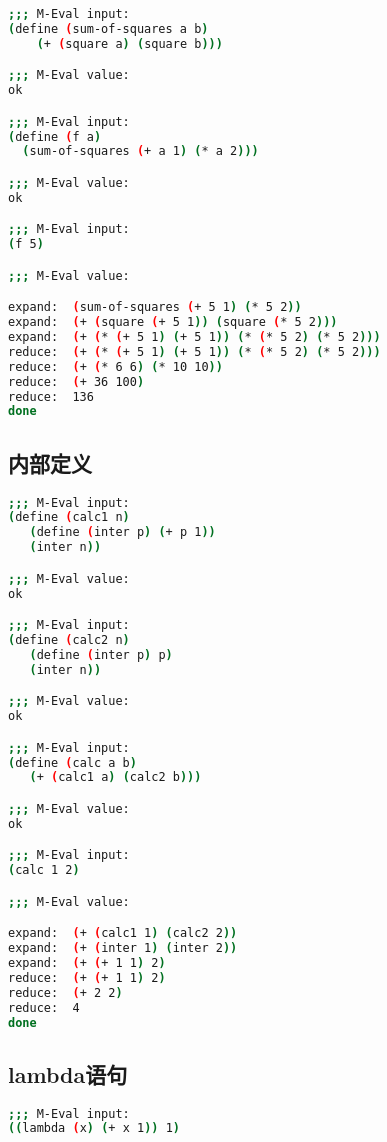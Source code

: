 \documentclass{article}
\begin{document}
\begin{CJK*}{UTF8}{gkai}
\begin{lstlisting}[language=bash, numbers=none, backgroundcolor=\color{black}, basicstyle=\scriptsize\color{green}\ttfamily\bfseries]
;;; M-Eval input:
(define (sum-of-squares a b)
    (+ (square a) (square b)))

;;; M-Eval value:
ok

;;; M-Eval input:
(define (f a)
  (sum-of-squares (+ a 1) (* a 2)))

;;; M-Eval value:
ok

;;; M-Eval input:
(f 5)

;;; M-Eval value:

expand:  (sum-of-squares (+ 5 1) (* 5 2))
expand:  (+ (square (+ 5 1)) (square (* 5 2)))
expand:  (+ (* (+ 5 1) (+ 5 1)) (* (* 5 2) (* 5 2)))
reduce:  (+ (* (+ 5 1) (+ 5 1)) (* (* 5 2) (* 5 2)))
reduce:  (+ (* 6 6) (* 10 10))
reduce:  (+ 36 100)
reduce:  136
done

\end{lstlisting}

\subsection{内部定义}

\begin{lstlisting}[language=bash, numbers=none, backgroundcolor=\color{black}, basicstyle=\scriptsize\color{green}\ttfamily\bfseries]
;;; M-Eval input:
(define (calc1 n)
   (define (inter p) (+ p 1))
   (inter n))

;;; M-Eval value:
ok

;;; M-Eval input:
(define (calc2 n)
   (define (inter p) p)
   (inter n))

;;; M-Eval value:
ok

;;; M-Eval input:
(define (calc a b)
   (+ (calc1 a) (calc2 b)))

;;; M-Eval value:
ok

;;; M-Eval input:
(calc 1 2)

;;; M-Eval value:

expand:  (+ (calc1 1) (calc2 2))
expand:  (+ (inter 1) (inter 2))
expand:  (+ (+ 1 1) 2)
reduce:  (+ (+ 1 1) 2)
reduce:  (+ 2 2)
reduce:  4
done
\end{lstlisting}

\subsection{lambda语句}

\begin{lstlisting}[language=bash, numbers=none, backgroundcolor=\color{black}, basicstyle=\scriptsize\color{green}\ttfamily\bfseries]
;;; M-Eval input:
((lambda (x) (+ x 1)) 1)


\end{lstlisting}
\end{CJK*}
\end{document}
